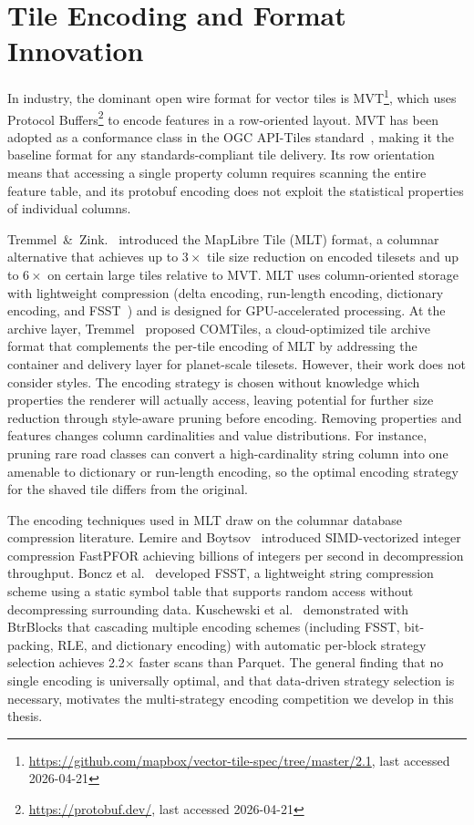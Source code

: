 \section{Tile Encoding and Format Innovation}\label{sec:rw_tile_encoding}

In industry, the dominant open wire format for vector tiles is \ac{MVT}\footnote{\url{https://github.com/mapbox/vector-tile-spec/tree/master/2.1}, last accessed 2026-04-21}, which uses Protocol Buffers\footnote{\url{https://protobuf.dev/}, last accessed 2026-04-21} to encode features in a row-oriented layout.
\ac{MVT} has been adopted as a conformance class in the \ac{OGC} API-Tiles standard~\cite{masoOGCAPITiles2022}, making it the baseline format for any standards-compliant tile delivery.
Its row orientation means that accessing a single property column requires scanning the entire feature table, and its protobuf encoding does not exploit the statistical properties of individual columns.

Tremmel~\&~Zink.~\cite{tremmelMapLibreTileNext2025b} introduced the MapLibre Tile (MLT) format, a columnar alternative that achieves up to $3\times$ tile size reduction on encoded tilesets and up to $6\times$ on certain large tiles relative to \ac{MVT}.
\ac{MLT} uses column-oriented storage with lightweight compression (delta encoding, run-length encoding, dictionary encoding, and \ac{FSST}~\cite{bonczFSSTFastRandom2020}) and is designed for \ac{GPU}-accelerated processing.
At the archive layer, Tremmel~\cite{tremmelCOMTILESCASESTUDY2023} proposed COMTiles, a cloud-optimized tile archive format that complements the per-tile encoding of \ac{MLT} by addressing the container and delivery layer for planet-scale tilesets.
However, their work does not consider styles.
The encoding strategy is chosen without knowledge which properties the renderer will actually access, leaving potential for further size reduction through style-aware pruning before encoding.
Removing properties and features changes column cardinalities and value distributions.
For instance, pruning rare road classes can convert a high-cardinality string column into one amenable to dictionary or run-length encoding, so the optimal encoding strategy for the shaved tile differs from the original.

The encoding techniques used in \ac{MLT} draw on the columnar database compression literature.
Lemire and Boytsov~\cite{lemireDecodingBillionsIntegers2015} introduced \ac{SIMD}-vectorized integer compression \ac{FastPFOR} achieving billions of integers per second in decompression throughput.
Boncz et al.~\cite{bonczFSSTFastRandom2020} developed \acf{FSST}, a lightweight string compression scheme using a static symbol table that supports random access without decompressing surrounding data.
Kuschewski et al.~\cite{kuschewskiBtrBlocksEfficientColumnar2023} demonstrated with BtrBlocks that cascading multiple encoding schemes (including \ac{FSST}, bit-packing, \ac{RLE}, and dictionary encoding) with automatic per-block strategy selection achieves 2.2$\times$ faster scans than Parquet.
The general finding that no single encoding is universally optimal, and that data-driven strategy selection is necessary, motivates the multi-strategy encoding competition we develop in this thesis.


